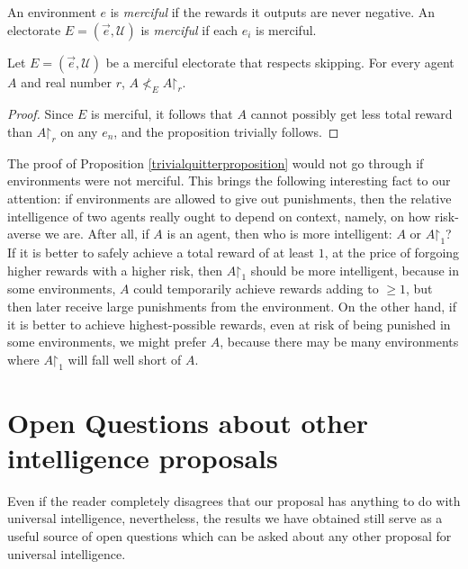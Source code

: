 \documentclass[twoside,11pt]{article}
\begin{document}
\begin{definition}
    An environment $e$ is \emph{merciful} if
    the rewards it outputs are never negative.
    An electorate $E=(\vec{e},\mathscr U)$ is \emph{merciful}
    if each $e_i$ is merciful.
\end{definition}

\begin{proposition}
\label{trivialquitterproposition}
    Let $E=(\vec{e},\mathscr U)$ be a merciful electorate that respects skipping.
    For every agent $A$ and real number $r$, $A\not<_{E}A\mathord{\restriction}_r$.
\end{proposition}

\begin{proof}
    Since $E$ is merciful,
    it follows that $A$ cannot possibly get less total reward than $A\mathord{\restriction}_r$
    on any $e_n$, and the proposition trivially follows.
\end{proof}


The proof of Proposition \ref{trivialquitterproposition} would not go through if
environments were not merciful.
This brings the following interesting fact to our attention:
if environments are allowed to give out punishments,
then the relative intelligence of two agents really ought to depend on
context, namely, on how risk-averse we are.
After all, if $A$ is an agent, then who
is more intelligent: $A$ or $A\mathord{\restriction}_1$?
If it is better to safely achieve a total reward of at
least $1$, at the price of forgoing higher rewards with a higher risk,
then $A\mathord{\restriction}_1$
should be more intelligent, because in some environments,
$A$ could temporarily achieve rewards adding to $\geq 1$, but then later
receive large punishments from the environment. On the other hand, if
it is better to achieve highest-possible rewards, even at risk of being punished
in some environments, we might prefer $A$, because there may be many environments
where $A\mathord{\restriction}_1$ will fall well short of $A$.


\section{Open Questions about other intelligence proposals}

Even if the reader completely disagrees that our proposal has anything to do with
universal intelligence, nevertheless, the results we have obtained still serve as
a useful source of open questions which can be asked about any other proposal for
universal intelligence.
\end{document}
